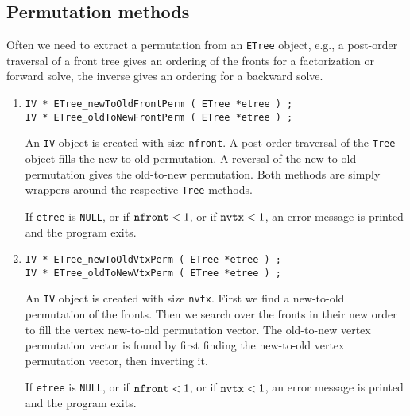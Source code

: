 \subsection{Permutation methods}
\label{subsection:ETree:proto:permutation}
\par
Often we need to extract a permutation from an {\tt ETree} object, 
e.g., a post-order traversal of a front tree gives an ordering of the
fronts for a factorization or forward solve, the inverse
gives an ordering for a backward solve.
\par
\begin{enumerate}
\item
\begin{verbatim}
IV * ETree_newToOldFrontPerm ( ETree *etree ) ;
IV * ETree_oldToNewFrontPerm ( ETree *etree ) ;
\end{verbatim}
An {\tt IV} object is created with size {\tt nfront}.
A post-order traversal of the {\tt Tree} object fills 
the new-to-old permutation. 
A reversal of the new-to-old permutation gives the
old-to-new permutation. 
Both methods are simply wrappers around the respective 
{\tt Tree} methods.
\par {}
If {\tt etree} is {\tt NULL},
or if ${\tt nfront} < 1$,
or if ${\tt nvtx} < 1$,
an error message is printed and the program exits.
\item
\begin{verbatim}
IV * ETree_newToOldVtxPerm ( ETree *etree ) ;
IV * ETree_oldToNewVtxPerm ( ETree *etree ) ;
\end{verbatim}
An {\tt IV} object is created with size {\tt nvtx}.
First we find a new-to-old permutation of the fronts.
Then we search over the fronts in their new order to
fill the vertex new-to-old permutation vector.
The old-to-new vertex permutation vector is found by first finding
the new-to-old vertex permutation vector, then inverting it.
\par {}
If {\tt etree} is {\tt NULL},
or if ${\tt nfront} < 1$,
or if ${\tt nvtx} < 1$,
an error message is printed and the program exits.

\end{enumerate}
